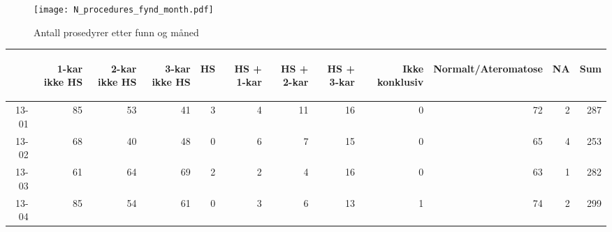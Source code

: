 \documentclass[presentation,xcolor=pdftex,dvipsnames,table]{beamer}
\begin{document}


\begin{frame}
\begin{figure}
  \centering
  \caption{Antall prosedyrer etter funn og måned}
\texttt{[image: N\_procedures\_fynd\_month.pdf]}
\end{figure}\end{frame}

\begin{frame}
\begin{tiny}
\begin{table}[ht]
\centering
\begin{tabular}{rrrrrrrrrrrr}
  \toprule
 & \begin{sideways} 1-kar ikke HS \end{sideways} & \begin{sideways} 2-kar ikke HS \end{sideways} & \begin{sideways} 3-kar ikke HS \end{sideways} & \begin{sideways} HS \end{sideways} & \begin{sideways} HS + 1-kar \end{sideways} & \begin{sideways} HS + 2-kar \end{sideways} & \begin{sideways} HS + 3-kar \end{sideways} & \begin{sideways} Ikke konklusiv \end{sideways} & \begin{sideways} Normalt/Ateromatose \end{sideways} & \begin{sideways} NA \end{sideways} & \begin{sideways} Sum \end{sideways} \\ 
  \midrule
13-01 & 85 & 53 & 41 & 3 & 4 & 11 & 16 & 0 & 72 & 2 & 287 \\ 
  13-02 & 68 & 40 & 48 & 0 & 6 & 7 & 15 & 0 & 65 & 4 & 253 \\ 
  13-03 & 61 & 64 & 69 & 2 & 2 & 4 & 16 & 0 & 63 & 1 & 282 \\ 
  13-04 & 85 & 54 & 61 & 0 & 3 & 6 & 13 & 1 & 74 & 2 & 299 \\ 

\end{tabular}
\end{table}
\end{tiny}
\end{frame}
\end{document}
